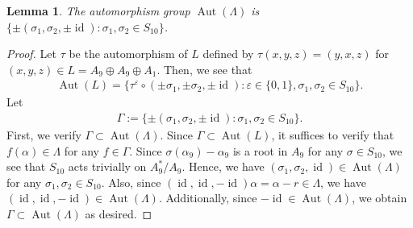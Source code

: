 \documentclass[reqno, 11pt]{amsart}
\numberwithin{equation}{section}
\newtheorem{lem}{Lemma}[section]
\theoremstyle{definition}
\DeclareMathOperator{\Aut}{Aut}
\DeclareMathOperator{\id}{id}
\newcommand{\sr}{ r } %
\begin{document}
\begin{lem}	\label{lem:aut}
	The automorphism group $\Aut(\Lambda)$ is $\{ \pm(\sigma_1, \sigma_2,  \pm \id)  :  \sigma_1, \sigma_2 \in S_{10} \} $.
\end{lem}
\begin{proof}
	Let $\tau$ be the automorphism of $L$ defined by $\tau(x,y,z) = (y,x,z)$ for $(x,y,z) \in L = A_9 \oplus A_9 \oplus A_1$.
	Then, we see that
	\begin{align*}
		\Aut(L) = \{ \tau^{\varepsilon} \circ (\pm \sigma_1, \pm \sigma_2,  \pm \id)  : \varepsilon \in \{0,1\}, \sigma_1, \sigma_2 \in S_{10} \}.
	\end{align*}
	Let
	\begin{align*}
		\Gamma := \{ \pm(\sigma_1, \sigma_2,  \pm \id)  :  \sigma_1, \sigma_2 \in S_{10} \}.
	\end{align*}
	First, we verify $\Gamma \subset \Aut(\Lambda)$.
	Since $\Gamma \subset \Aut(L)$, it suffices to verify that $f(\alpha) \in \Lambda$ for any $f \in \Gamma$.
Since $\sigma(\alpha_9)-\alpha_9$ is a root in $A_9$ for any $\sigma\in S_{10}$, we see that 
$S_{10}$ acts trivially on $A_9^*/A_9$.
	Hence, we have $(\sigma_1, \sigma_2, \id) \in \Aut(\Lambda)$ for any $\sigma_1, \sigma_2 \in S_{10}$.
	Also, since $(\id,\id,-\id)\alpha = \alpha - \sr \in \Lambda$, we have $(\id,\id,-\id) \in \Aut(\Lambda)$.
	Additionally, since $-\id \in \Aut(\Lambda)$, we obtain $\Gamma \subset \Aut(\Lambda)$ as desired.
	

\end{proof}
\end{document}

